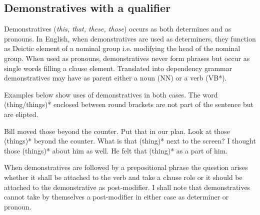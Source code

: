 

\subsection{Demonstratives with a qualifier}
%     
Demonstratives (\textit{this, that, these, those}) occurs as both determines and as pronouns. In English, when demonstratives are used as determiners, they function as Deictic element of a nominal group i.e. modifying the head of the nominal group. When used as pronouns, demonstratives never form phrases but occur as single words filling a clause element. Translated into dependency grammar demonstratives may have as parent either a noun (NN) or a verb (VB*). 

Examples below show uses of demonstratives in both cases. The word (thing/things)* enclosed between round brackets are not part of the sentence but are elipted.  

\begin{exe}
\ex\label{ex:demonstrative1} Bill moved those beyond the counter.
\ex\label{ex:demonstrative2} Put that in our plan.
\ex\label{ex:demonstrative3} Look at those (things)* beyond the counter.
\ex\label{ex:demonstrative4} What is that (thing)* next to the screen?
\ex\label{ex:demonstrative5} I thought those (things)* about him as well.
\ex\label{ex:demonstrative6} He felt that (thing)* as a part of him. 
\end{exe}
When demonstratives are followed by a prepositional phrase the question arises whether it shall be attached to the verb and take a clause role or it should be attached to the demonstrative as post-modifier. I shall note that demonstratives cannot take by themselves a post-modifier in either case as determiner or pronoun. 

